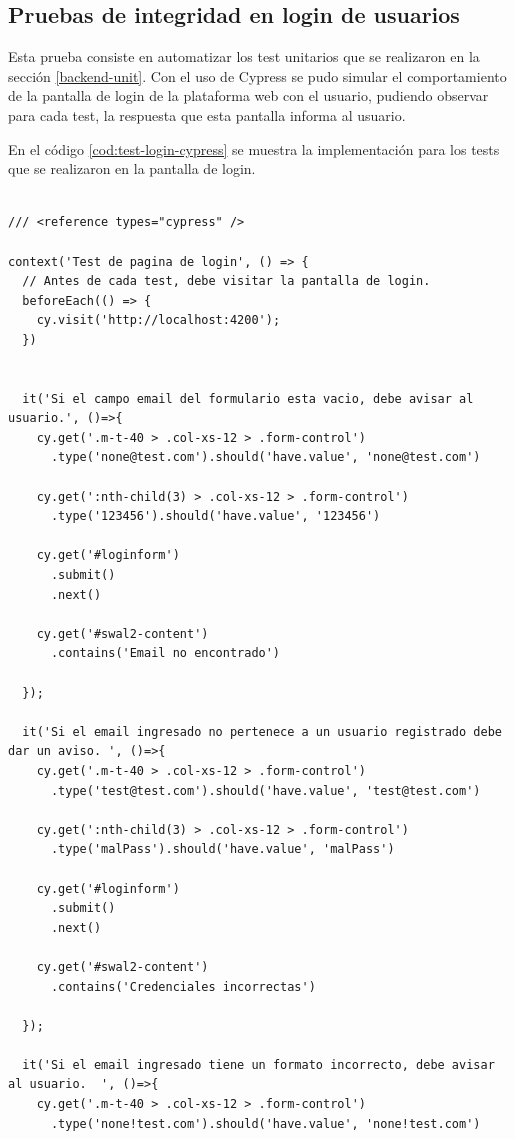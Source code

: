 \subsection{Pruebas de integridad en login de usuarios}
\label{login-tests}
Esta prueba consiste en automatizar los test unitarios que se realizaron en la sección \ref{backend-unit}. Con el uso de Cypress se pudo simular el comportamiento de la pantalla de login de la plataforma web con el usuario, pudiendo observar para cada test, la respuesta que esta pantalla informa al usuario.

En el código \ref{cod:test-login-cypress} se muestra la implementación para los tests que se realizaron en la pantalla de login.

\begin{lstlisting}[label=cod:test-login-cypress,caption=Código de implementación para tests realizados en la pantalla de login de la plataforma web.] 

/// <reference types="cypress" />

context('Test de pagina de login', () => {
  // Antes de cada test, debe visitar la pantalla de login.
  beforeEach(() => {
    cy.visit('http://localhost:4200');
  })


  it('Si el campo email del formulario esta vacio, debe avisar al usuario.', ()=>{
    cy.get('.m-t-40 > .col-xs-12 > .form-control')
      .type('none@test.com').should('have.value', 'none@test.com')
    
    cy.get(':nth-child(3) > .col-xs-12 > .form-control')
      .type('123456').should('have.value', '123456')

    cy.get('#loginform')
      .submit()
      .next()

    cy.get('#swal2-content')
      .contains('Email no encontrado')
  
  });

  it('Si el email ingresado no pertenece a un usuario registrado debe dar un aviso. ', ()=>{
    cy.get('.m-t-40 > .col-xs-12 > .form-control')
      .type('test@test.com').should('have.value', 'test@test.com')
    
    cy.get(':nth-child(3) > .col-xs-12 > .form-control')
      .type('malPass').should('have.value', 'malPass')

    cy.get('#loginform')
      .submit()
      .next()

    cy.get('#swal2-content')
      .contains('Credenciales incorrectas')
  
  });

  it('Si el email ingresado tiene un formato incorrecto, debe avisar al usuario.  ', ()=>{
    cy.get('.m-t-40 > .col-xs-12 > .form-control')
      .type('none!test.com').should('have.value', 'none!test.com')
    

\end{lstlisting}
